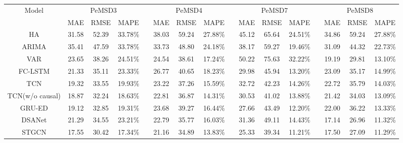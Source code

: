\documentclass[letterpaper]{article} \usepackage{aaai22}  \usepackage{times}  \usepackage{helvet}  \usepackage{courier}  \usepackage[hyphens]{url}  \usepackage{graphicx} \urlstyle{rm} \def\UrlFont{\rm}  \usepackage{natbib}  \usepackage{caption} \DeclareCaptionStyle{ruled}{labelfont=normalfont,labelsep=colon,strut=off} \frenchspacing  \setlength{\pdfpagewidth}{8.5in}  \setlength{\pdfpageheight}{11in}  \usepackage{stfloats}
\begin{document}
\begin{table*}[t]
    \centering
    \setlength{\tabcolsep}{4pt}
    \small
    \begin{tabular}{c ccc c ccc c ccc c ccc}
        \hline
        \multirow{2}{*}{Model}  & \multicolumn{3}{c}{PeMSD3}    && \multicolumn{3}{c}{PeMSD4}      && \multicolumn{3}{c}{PeMSD7}      && \multicolumn{3}{c}{PeMSD8}\\\cline{2-4} \cline{6-8} \cline{10-12} \cline{14-16}
                                & MAE & RMSE & MAPE             && MAE & RMSE & MAPE               && MAE & RMSE & MAPE               && MAE & RMSE & MAPE               \\ \hline
        HA                      & 31.58 & 52.39 & 33.78\%       && 38.03 & 59.24 & 27.88\%         && 45.12 & 65.64 & 24.51\%         && 34.86 & 59.24 & 27.88\%         \\       
        ARIMA                   & 35.41 & 47.59 & 33.78\%       && 33.73 & 48.80 & 24.18\%         && 38.17 & 59.27 & 19.46\%         && 31.09 & 44.32 & 22.73\%\\        
        VAR                     & 23.65 & 38.26 & 24.51\%       && 24.54 & 38.61 & 17.24\%         && 50.22 & 75.63 & 32.22\%         && 19.19 & 29.81 & 13.10\%         \\                     
        FC-LSTM                 & 21.33 & 35.11 & 23.33\%       && 26.77 & 40.65 & 18.23\%         && 29.98 & 45.94 & 13.20\%         && 23.09 & 35.17 & 14.99\%         \\ 
        TCN                     & 19.32 & 33.55 & 19.93\%       && 23.22 & 37.26 & 15.59\%         && 32.72 & 42.23 & 14.26\%         && 22.72 & 35.79 & 14.03\%         \\  
        TCN(w/o causal)         & 18.87 & 32.24 & 18.63\%       && 22.81 & 36.87 & 14.31\%         && 30.53 & 41.02 & 13.88\%         && 21.42 & 34.03 & 13.09\%         \\  
        GRU-ED                  & 19.12 & 32.85 & 19.31\%       && 23.68 & 39.27 & 16.44\%         && 27.66 & 43.49 & 12.20\%         && 22.00 & 36.22 & 13.33\%         \\       
        DSANet                  & 21.29 & 34.55 & 23.21\%       && 22.79 & 35.77 & 16.03\%         && 31.36 & 49.11 & 14.43\%         && 17.14 & 26.96 & 11.32\%         \\       
        STGCN                   & 17.55 & 30.42 & 17.34\%       && 21.16 & 34.89 & 13.83\%         && 25.33 & 39.34 & 11.21\%         && 17.50 & 27.09 & 11.29\%         \\ 

\end{tabular}
\end{table*}
\end{document}
